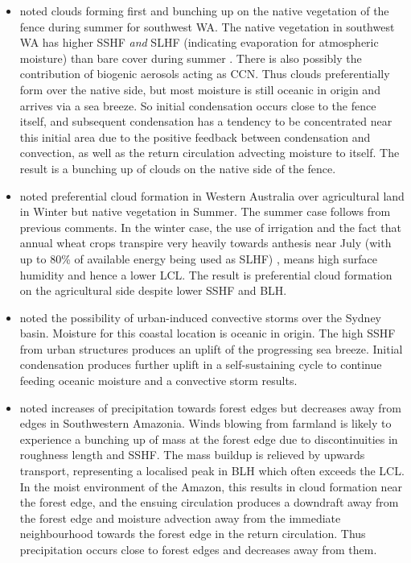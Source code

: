 \begin{itemize}
	\item \citet{lyons2002} noted clouds forming first and bunching up on the native vegetation of the fence during summer for southwest \ac{WA}. The native vegetation in southwest \ac{WA} has higher \ac{SSHF} \textit{and} \ac{SLHF} (indicating evaporation for atmospheric moisture) than bare cover during summer \citep{lyons1996}. There is also possibly the contribution of biogenic aerosols acting as \ac{CCN}. Thus clouds preferentially form over the native side, but most moisture is still oceanic in origin and arrives via a sea breeze. So initial condensation occurs close to the fence itself, and subsequent condensation has a tendency to be concentrated near this initial area due to the positive feedback between condensation and convection, as well as the return circulation advecting moisture to itself. The result is a bunching up of clouds on the native side of the fence. 
	\item \citet{ray2003} noted preferential cloud formation in Western Australia over agricultural land in Winter but native vegetation in Summer. The summer case follows from previous comments. In the winter case, the use of irrigation and the fact that annual wheat crops transpire very heavily towards anthesis near July (with up to 80\% of available energy being used as \ac{SLHF}) \citep{lyons1996}, means high surface humidity and hence a lower \ac{LCL}. The result is preferential cloud formation on the agricultural side despite lower \ac{SSHF} and \ac{BLH}.
	\item \citet{gero2006} noted the possibility of urban-induced convective storms over the Sydney basin. Moisture for this coastal location is oceanic in origin. The high \ac{SSHF} from urban structures produces an uplift of the progressing sea breeze. Initial condensation produces further uplift in a self-sustaining cycle to continue feeding oceanic moisture and a convective storm results.
	\item \citet{knox2011} noted increases of precipitation towards forest edges but decreases away from edges in Southwestern Amazonia. Winds blowing from farmland is likely to experience a bunching up of mass at the forest edge due to discontinuities in roughness length and \ac{SSHF}. The mass buildup is relieved by upwards transport, representing a localised peak in \ac{BLH} which often exceeds the \ac{LCL}. In the moist environment of the Amazon, this results in cloud formation near the forest edge, and the ensuing circulation produces a downdraft away from the forest edge and moisture advection away from the immediate neighbourhood towards the forest edge in the return circulation. Thus precipitation occurs close to forest edges and decreases away from them. 

\end{itemize}

